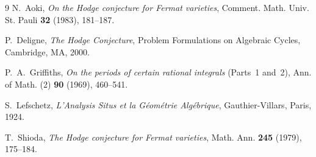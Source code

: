 \documentclass[11pt,a4paper]{article}
\begin{document}
\begin{thebibliography}{9}
N.~Aoki, \emph{On the Hodge conjecture for Fermat varieties}, Comment. Math. Univ. St. Pauli \textbf{32} (1983), 181--187.

P.~Deligne, \emph{The Hodge Conjecture}, Problem Formulations on Algebraic Cycles, Cambridge, MA, 2000.

P.~A.~Griffiths, \emph{On the periods of certain rational integrals} (Parts~1 and~2), Ann. of Math. (2) \textbf{90} (1969), 460--541.

S.~Lefschetz, \emph{L'Analysis Situs et la G\'eom\'etrie Alg\'ebrique}, Gauthier-Villars, Paris, 1924.

T.~Shioda, \emph{The Hodge conjecture for Fermat varieties}, Math. Ann. \textbf{245} (1979), 175--184.
\end{thebibliography}
\end{document}

